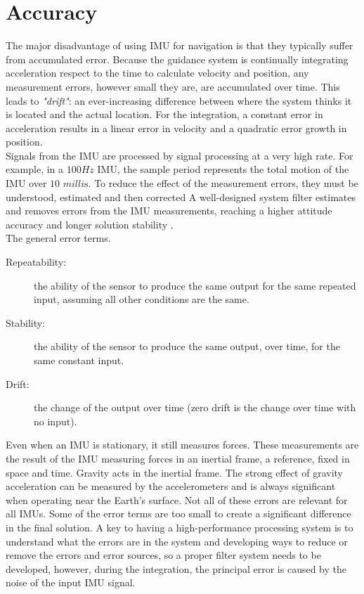 \documentclass[tesi]{subfiles}
\begin{document}
\section{Accuracy}\label{sc:Error}
The major disadvantage of using IMU for navigation is that they typically suffer from accumulated error. Because the guidance system is continually integrating acceleration respect to the time to calculate velocity and position, any measurement errors, however small they are, are accumulated over time. This leads to \textit{"drift"}: an ever-increasing difference between where the system thinks it is located and the actual location. For the integration, a constant error in acceleration results in a linear error in velocity and a quadratic error growth in position.\cite{siciliano2016springer}\\
Signals from the IMU are processed by signal processing at a very high rate. For example, in a $100 Hz$ IMU, the sample period represents the total motion of the IMU over $10$ $ \si{milli\second}$. 
To reduce the effect of the measurement errors, they must be understood, estimated and then corrected
A well-designed system filter estimates and removes errors from the IMU measurements, reaching a higher attitude accuracy and longer solution stability .\\
The general error terms.
\begin{description}
\item [Repeatability:] the ability of the sensor to produce the same output for the same repeated input, assuming all other conditions are the same.
\item [Stability:] the ability of the sensor to produce the same output, over time, for the same constant input. 
\item [Drift:] the change of the output over time (zero drift is the change over time with no input).
\end{description}
Even when an IMU is stationary, it still measures forces. These measurements are the result of the IMU measuring forces in an inertial frame, a reference, fixed in space and time. Gravity acts in the inertial frame. The strong effect of gravity acceleration  can be measured by the accelerometers and is always significant when operating near the Earth’s surface.
Not all of these errors are relevant for all IMUs. Some of the error terms are too small to create a significant difference in the final solution. A key to having a high-performance processing system is to understand what the errors are in the system and developing ways to reduce or remove the errors and error sources, so a proper filter system needs to be developed, however, during the integration, the principal error is caused by the noise of the input IMU signal.
\end{document}
